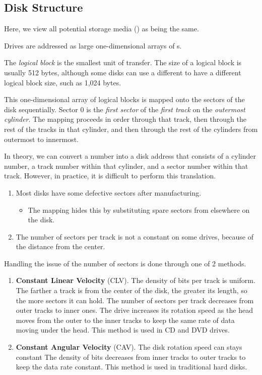\subsection{Disk Structure}\label{subsec:Disk_Structure}
Here, we view all potential storage media () as being the same.

Drives are addressed as large one-dimensional arrays of s.

\begin{definition}\label{def:Logical_Block}
  The \emph{logical block} is the smallest unit of transfer.
  The size of a logical block is usually 512 bytes, although some disks can use a different  to have a different logical block size, such as 1,024 bytes.
\end{definition}

This one-dimensional array of logical blocks is mapped onto the sectors of the disk sequentially.
Sector 0 is the \emph{first sector} of the \emph{first track} on the \emph{outermost cylinder}.
The mapping proceeds in order through that track, then through the rest of the tracks in that cylinder, and then through the rest of the cylinders from outermost to innermost.

In theory, we can convert a  number into a disk address that consists of a cylinder number, a track number within that cylinder, and a sector number within that track.
However, in practice, it is difficult to perform this translation.
\begin{enumerate}[noitemsep]
\item Most disks have some defective sectors after manufacturing.
  \begin{itemize}[noitemsep]
  \item The mapping hides this by substituting spare sectors from elsewhere on the disk.
\end{itemize}

\item The number of sectors per track is not a constant on some drives, because of the distance from the center.
\end{enumerate}

Handling the issue of the number of sectors is done through one of 2 methods.
\begin{enumerate}[noitemsep]
\item \textbf{Constant Linear Velocity} (CLV).
  The density of bits per track is uniform.
  The farther a track is from the center of the disk, the greater its length, so the more sectors it can hold.
  The number of sectors per track decreases from outer tracks to inner ones.
  The drive increases its rotation speed as the head moves from the outer to the inner tracks to keep the same rate of data moving under the head.
  This method is used in CD and DVD drives.
\item \textbf{Constant Angular Velocity} (CAV).
  The disk rotation speed can stays constant
  The density of bits decreases from inner tracks to outer tracks to keep the data rate constant.
  This method is used in traditional hard disks.
\end{enumerate}

